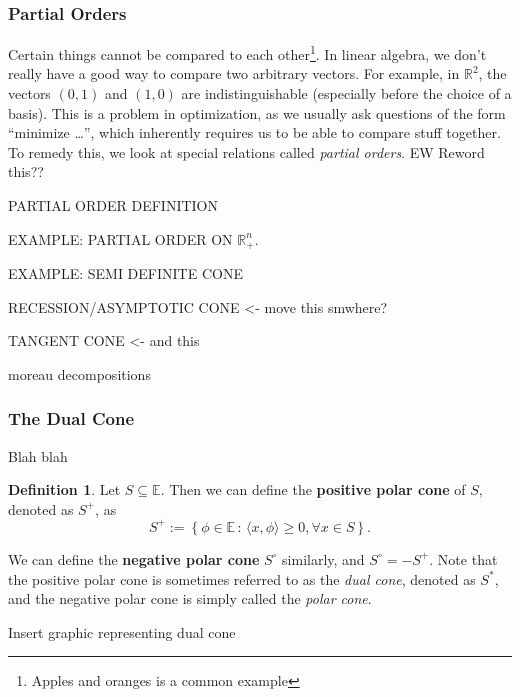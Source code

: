 \documentclass[11pt]{article}
\numberwithin{equation}{section}
\theoremstyle{definition}
\newtheorem{definition}[theorem]{Definition}%
\newcommand{\bE}{\mathbb{E}}
\newcommand{\bR}{\mathbb{R}}
\newcommand{\set}[2]{\left\{#1\,:\,#2\right\}}
\begin{document}
\subsubsection{Partial Orders}
Certain things cannot be compared to each other\footnote{Apples and oranges is a common example}. In linear algebra, we don't really have a good way to compare two arbitrary vectors. For example, in $\bR^2$, the vectors $(0, 1)$ and $(1, 0)$ are indistinguishable (especially before the choice of a basis). This is a problem in optimization, as we usually ask questions of the form ``minimize \dots'', which inherently requires us to be able to compare stuff together. To remedy this, we look at special relations called \textit{partial orders}. EW Reword this??

PARTIAL ORDER DEFINITION

EXAMPLE: PARTIAL ORDER ON $\bR^n_+$.

EXAMPLE: SEMI DEFINITE CONE

RECESSION/ASYMPTOTIC CONE <- move this smwhere?

TANGENT CONE <- and this

moreau decompositions

\subsubsection{The Dual Cone}
Blah blah
\begin{definition}
    Let $S\subseteq\bE$. Then we can define the \textbf{positive polar cone} of $S$, denoted as $S^+$, as
    \begin{equation}
        S^+:=\set{\phi\in\bE}{\langle x,\phi\rangle\ge 0,\forall x\in S}.
    \end{equation}
\end{definition}
We can define the \textbf{negative polar cone} $S^\circ $ similarly, and $S^\circ=-S^+$. Note that the positive polar cone is sometimes referred to as the \textit{dual cone}, denoted as $S^*$, and the negative polar cone is simply called the \textit{polar cone}.

Insert graphic representing dual cone
\end{document}
